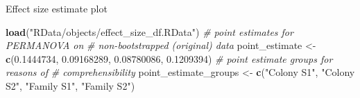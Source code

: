 \documentclass[]{article}
\newenvironment{Shaded}{\begin{snugshade}}{\end{snugshade}}
\newcommand{\KeywordTok}[1]{\textcolor[rgb]{0.13,0.29,0.53}{\textbf{#1}}}
\newcommand{\FloatTok}[1]{\textcolor[rgb]{0.00,0.00,0.81}{#1}}
\newcommand{\StringTok}[1]{\textcolor[rgb]{0.31,0.60,0.02}{#1}}
\newcommand{\CommentTok}[1]{\textcolor[rgb]{0.56,0.35,0.01}{\textit{#1}}}
\newcommand{\NormalTok}[1]{#1}
\begin{document}
Effect size estimate plot

\begin{Shaded}
\begin{Highlighting}[]
\KeywordTok{load}\NormalTok{(}\StringTok{"RData/objects/effect_size_df.RData"}\NormalTok{)}
\CommentTok{# point estimates for PERMANOVA on}
\CommentTok{# non-bootstrapped (original) data}
\NormalTok{point_estimate <-}\StringTok{ }\KeywordTok{c}\NormalTok{(}\FloatTok{0.1444734}\NormalTok{, }\FloatTok{0.09168289}\NormalTok{, }
    \FloatTok{0.08780086}\NormalTok{, }\FloatTok{0.1209394}\NormalTok{)}
\CommentTok{# point estimate groups for reasons of}
\CommentTok{# comprehensibility}
\NormalTok{point_estimate_groups <-}\StringTok{ }\KeywordTok{c}\NormalTok{(}\StringTok{"Colony S1"}\NormalTok{, }\StringTok{"Colony S2"}\NormalTok{, }
    \StringTok{"Family S1"}\NormalTok{, }\StringTok{"Family S2"}\NormalTok{)}


\end{Highlighting}
\end{Shaded}
\end{document}

